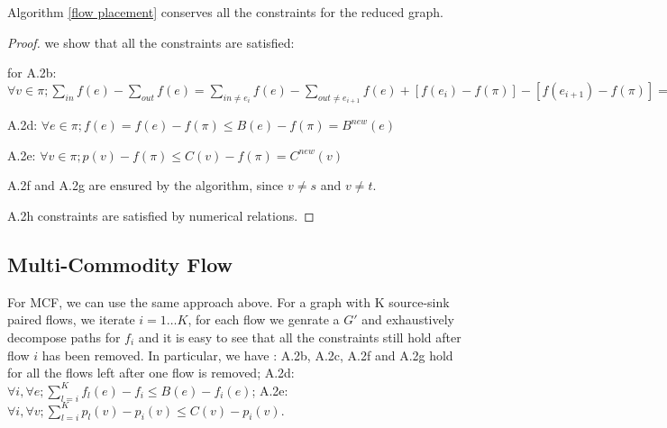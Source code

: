 \begin{lemma}  Algorithm \ref{flow placement} conserves all the constraints for the reduced graph.
\end{lemma}
\begin{proof}
we show that all the constraints are satisfied:

for A.2b:
$\forall v \in \pi; \sum\limits_{in}  f(e) - \sum\limits_{out} f(e)=\sum\limits_{in \not=e_i}  f(e) - \sum\limits_{out\not=e_{i+1} } f(e) +[f(e_i)-f(\pi) ] - [f(e_{i+1}) -f(\pi)] = 0 $

A.2d:
$\forall e \in \pi; f(e) = f(e)-f(\pi) \leq B(e)-f(\pi)=B^{new}(e)$ 

A.2e:
$\forall v \in \pi; p(v) - f(\pi) \leq C(v) - f(\pi) =C^{new}(v)$

A.2f and A.2g are ensured by the algorithm, since $v\not=s $ and $ v\not=t$.

A.2h constraints are satisfied by numerical relations.
\end{proof}

\subsection{Multi-Commodity Flow}
For MCF, we can use the same approach above. For a graph with K source-sink paired flows,  we iterate $i = 1 \dots K$, for each flow we genrate a $G'$ and exhaustively decompose paths for $f_i$ and it is easy to see that all the constraints still hold after flow $i$ has been removed.  
In particular, we have :
A.2b, A.2c, A.2f and A.2g  hold for all the flows left after one flow is removed;
A.2d: $\forall i,\forall e;  \sum\limits_{l=i}^K f_l(e) - f_i\leq B(e) - f_i(e)$;
A.2e: $\forall i,\forall v;  \sum\limits_{l=i}^K p_l(v) -p_i(v)\leq C(v) - p_i(v)$.
